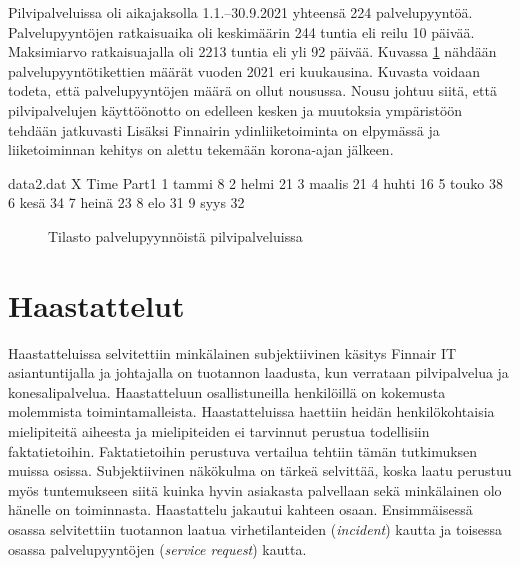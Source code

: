 Pilvipalveluissa oli aikajaksolla 1.1.--30.9.2021 yhteensä 224 palvelupyyntöä. Palvelupyyntöjen ratkaisuaika oli keskimäärin 244 tuntia eli reilu 10 päivää. Maksimiarvo ratkaisuajalla oli 2213 tuntia eli yli 92 päivää. Kuvassa \ref{fig:pilvipyynto} nähdään palvelupyyntötikettien määrät vuoden 2021 eri kuukausina. Kuvasta voidaan todeta, että palvelupyyntöjen määrä on ollut nousussa. Nousu johtuu siitä, että pilvipalvelujen käyttöönotto on edelleen kesken ja muutoksia ympäristöön tehdään jatkuvasti Lisäksi Finnairin ydinliiketoiminta on elpymässä ja liiketoiminnan kehitys on alettu tekemään korona-ajan jälkeen.

\begin{filecontents}{data2.dat}
X Time  	Part1
1 tammi  	8
2 helmi		21
3 maalis	21
4 huhti		16
5 touko		38
6 kesä		34
7 heinä		23
8 elo       31
9 syys      32
\end{filecontents}

\begin{figure}[ht]
\caption{Tilasto palvelupyynnöistä pilvipalveluissa}
\label{fig:pilvipyynto}
\end{figure}

\section{Haastattelut}
Haastatteluissa selvitettiin minkälainen subjektiivinen käsitys Finnair IT asiantuntijalla ja johtajalla on tuotannon laadusta, kun verrataan pilvipalvelua ja konesalipalvelua. Haastatteluun osallistuneilla henkilöillä on kokemusta molemmista toimintamalleista. Haastatteluissa haettiin heidän henkilökohtaisia mielipiteitä aiheesta ja mielipiteiden ei tarvinnut perustua todellisiin faktatietoihin. Faktatietoihin perustuva vertailua tehtiin tämän tutkimuksen muissa osissa. Subjektiivinen näkökulma on tärkeä selvittää, koska laatu perustuu myös tuntemukseen siitä kuinka hyvin asiakasta palvellaan sekä minkälainen olo hänelle on toiminnasta. Haastattelu jakautui kahteen osaan. Ensimmäisessä osassa selvitettiin tuotannon laatua virhetilanteiden (\emph{incident}) kautta ja toisessa osassa palvelupyyntöjen (\emph{service request}) kautta.

